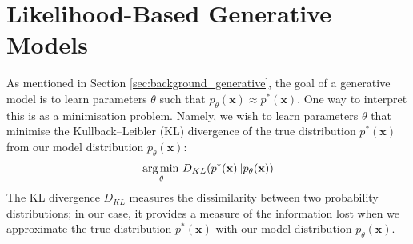 \documentclass[ oneside,%
                    author={George Herbert},
                    degree={MSci},
                     title={Video Diffusion Models for Climate Simulations},
                  subtitle={}]{dissertation}
\begin{document}
\section{Likelihood-Based Generative Models}
\label{sec:background_unbiased_objective}

As mentioned in Section \ref{sec:background_generative}, the goal of a generative model is to learn parameters $\theta$ such that $p_\theta(\mathbf{x})\approx p^*(\mathbf{x})$. One way to interpret this is as a minimisation problem. Namely, we wish to learn parameters $\theta$ that minimise the Kullback--Leibler (KL) divergence of the true distribution $p^*(\mathbf{x})$ from our model distribution $p_\theta(\mathbf{x})$:
\begin{align}
      \operatorname*{arg\,min\,}_\theta D_{KL}(p^*(\mathbf{x})\Vert p_\theta(\mathbf{x}))
\end{align}
The KL divergence $D_{KL}$ measures the dissimilarity between two probability distributions; in our case, it provides a measure of the information lost when we approximate the true distribution $p^*(\mathbf{x})$ with our model distribution $p_\theta(\mathbf{x})$.
\end{document}

